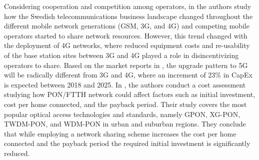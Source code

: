 







Considering cooperation and competition among operators, in \cite{Markendahl666147} the authors study how the Swedish telecommunications business landscape changed throughout the different mobile network generations (GSM, 3G, and 4G) and competing mobile operators started to share network resources. However, this trend changed with the deployment of 4G networks, where reduced equipment costs and re-usability of the base station sites between 3G and 4G played a role in disincentivizing operators to share. %
Based on the market reports in \cite{GABRIEL}, the upgrade pattern to \ac{5G} will be radically different from 3G and 4G, where an increment of 23\% in \ac{CapEx} is expected between 2018 and 2025.
In \cite{6871680}, the authors conduct a cost assessment studying how \ac{PON}/\ac{FTTH} network could affect factors such as initial investment, cost per home connected, and the payback period. Their study covers the most popular optical access technologies and standards, namely \ac{GPON}, XG-PON, TWDM-PON, and \ac{WDM}-\ac{PON} in urban and suburban regions. They conclude that while employing a network sharing scheme increases the cost per home connected and the payback period the required initial investment is significantly reduced. 

